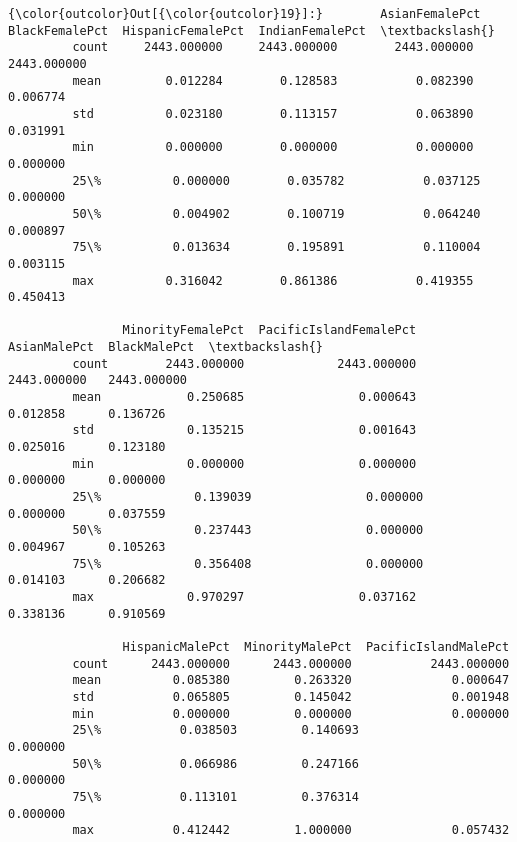 \documentclass[11pt]{article}
\begin{document}
\begin{Verbatim}[commandchars=\\\{\}]
{\color{outcolor}Out[{\color{outcolor}19}]:}        AsianFemalePct  BlackFemalePct  HispanicFemalePct  IndianFemalePct  \textbackslash{}
         count     2443.000000     2443.000000        2443.000000      2443.000000   
         mean         0.012284        0.128583           0.082390         0.006774   
         std          0.023180        0.113157           0.063890         0.031991   
         min          0.000000        0.000000           0.000000         0.000000   
         25\%          0.000000        0.035782           0.037125         0.000000   
         50\%          0.004902        0.100719           0.064240         0.000897   
         75\%          0.013634        0.195891           0.110004         0.003115   
         max          0.316042        0.861386           0.419355         0.450413   
         
                MinorityFemalePct  PacificIslandFemalePct  AsianMalePct  BlackMalePct  \textbackslash{}
         count        2443.000000             2443.000000   2443.000000   2443.000000   
         mean            0.250685                0.000643      0.012858      0.136726   
         std             0.135215                0.001643      0.025016      0.123180   
         min             0.000000                0.000000      0.000000      0.000000   
         25\%             0.139039                0.000000      0.000000      0.037559   
         50\%             0.237443                0.000000      0.004967      0.105263   
         75\%             0.356408                0.000000      0.014103      0.206682   
         max             0.970297                0.037162      0.338136      0.910569   
         
                HispanicMalePct  MinorityMalePct  PacificIslandMalePct  
         count      2443.000000      2443.000000           2443.000000  
         mean          0.085380         0.263320              0.000647  
         std           0.065805         0.145042              0.001948  
         min           0.000000         0.000000              0.000000  
         25\%           0.038503         0.140693              0.000000  
         50\%           0.066986         0.247166              0.000000  
         75\%           0.113101         0.376314              0.000000  
         max           0.412442         1.000000              0.057432  
\end{Verbatim}
            
\end{document}

